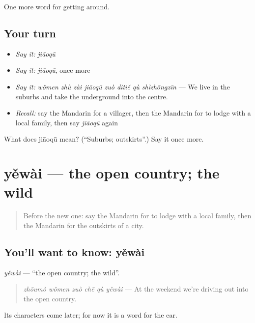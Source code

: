 \begin{grammarlens}[title={What you've built}]
One more word for getting around.
\end{grammarlens}

\subsection*{Your turn}
\begin{itemize}
\raggedright
  \item \emph{Say it:} \emph{jiāoqū}
  \item \emph{Say it:} \emph{jiāoqū}, once more
  \item \emph{Say it:} \emph{wǒmen zhù zài jiāoqū zuò dìtiě qù shìzhōngxīn} — We live in the suburbs and take the underground into the centre.
  \item \emph{Recall:} say the Mandarin for a villager, then the Mandarin for to lodge with a local family, then say \emph{jiāoqū} again
\end{itemize}

\begin{tcolorbox}[breakable,colback=teal!4,colframe=teal!35!black,title={Before you move on}]
What does jiāoqū mean? (\textquotedblleft{}Suburbs; outskirts\textquotedblright{}.) Say it once more.
\end{tcolorbox}
\section[yěwài]{yěwài — the open country; the wild}

\label{lesson:ZH-C441-yewai}



\begin{quote}
Before the new one: say the Mandarin for to lodge with a local family, then the Mandarin for the outskirts of a city.
\end{quote}

\subsection*{You'll want to know: yěwài}
\emph{yěwài} — \textquotedblleft{}the open country; the wild\textquotedblright{}.

\begin{quote}
\emph{zhōumò wǒmen zuò chē qù yěwài} — At the weekend we're driving out into the open country.
\end{quote}

Its characters come later; for now it is a word for the ear.

